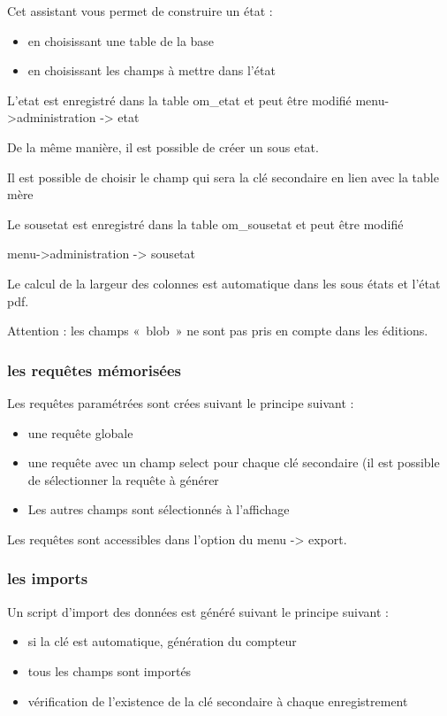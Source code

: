\documentclass[letterpaper,10pt,french]{manual}
\begin{document}
Cet assistant vous permet de construire un état :
\begin{itemize}
\item {} 
en choisissant une table de la base

\item {} 
en choisissant les champs à mettre dans l'état

\end{itemize}

L'etat est enregistré dans la table om\_etat et peut être modifié
menu-\textgreater{}administration -\textgreater{} etat

De la même manière, il est possible de créer un sous etat.

Il est possible de choisir le champ qui sera la clé secondaire en lien avec la table mère

Le sousetat est enregistré dans la table om\_sousetat et peut être modifié

menu-\textgreater{}administration -\textgreater{} sousetat

Le calcul de la largeur des colonnes est automatique dans les sous états et l'état pdf.

Attention :  les champs « blob » ne sont pas pris en compte dans les éditions.


\subsubsection{les requêtes mémorisées}

Les requêtes paramétrées sont crées suivant le principe suivant :
\begin{itemize}
\item {} 
une requête globale

\item {} 
une requête avec un champ select pour chaque clé secondaire (il est possible de sélectionner la requête à générer

\item {} 
Les autres champs sont sélectionnés à l'affichage

\end{itemize}

Les requêtes sont accessibles dans l'option du menu -\textgreater{} export.


\subsubsection{les imports}

Un script d'import des données est généré suivant le principe suivant :
\begin{itemize}
\item {} 
si la clé est automatique, génération du compteur

\item {} 
tous les champs sont importés

\item {} 
vérification de l'existence de la clé secondaire à chaque enregistrement

\end{itemize}
\end{document}

